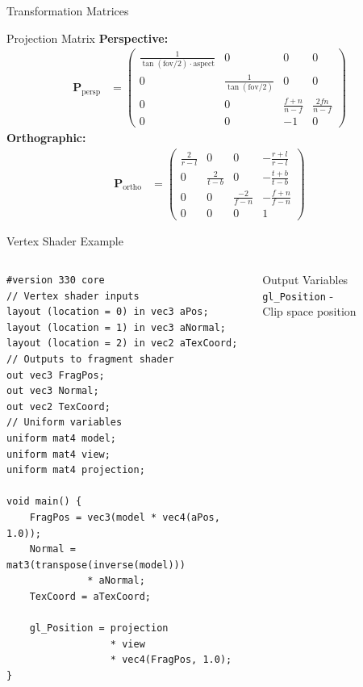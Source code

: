 \begin{frame}{Transformation Matrices}
{\begin{mathbox}{Projection Matrix}
      \textbf{Perspective:}
      \begin{align*}
        \mathbf{P}_{\text{persp}} &=
        \begin{pmatrix}
          \frac{1}{\tan(\text{fov}/2) \cdot \text{aspect}} & 0 & 0 & 0 \\
          0 & \frac{1}{\tan(\text{fov}/2)} & 0 & 0 \\
          0 & 0 & \frac{f+n}{n-f} & \frac{2fn}{n-f} \\
          0 & 0 & -1 & 0
        \end{pmatrix}
      \end{align*}
      \textbf{Orthographic:}
      \begin{align*}
        \mathbf{P}_{\text{ortho}} &=
        \begin{pmatrix}
          \frac{2}{r-l} & 0 & 0 & -\frac{r+l}{r-l} \\
          0 & \frac{2}{t-b} & 0 & -\frac{t+b}{t-b} \\
          0 & 0 & \frac{-2}{f-n} & -\frac{f+n}{f-n} \\
          0 & 0 & 0 & 1
        \end{pmatrix}
      \end{align*}
    \end{mathbox}
  }
\end{frame}

\begin{frame}[fragile]{Vertex Shader Example}
  \begin{columns}
    \begin{column}{0.6\textwidth}
      \begin{verbatim}
#version 330 core
// Vertex shader inputs
layout (location = 0) in vec3 aPos;
layout (location = 1) in vec3 aNormal;
layout (location = 2) in vec2 aTexCoord;
// Outputs to fragment shader
out vec3 FragPos;
out vec3 Normal;
out vec2 TexCoord;
// Uniform variables
uniform mat4 model;
uniform mat4 view;
uniform mat4 projection;

void main() {
    FragPos = vec3(model * vec4(aPos, 1.0));
    Normal = mat3(transpose(inverse(model)))
              * aNormal;
    TexCoord = aTexCoord;

    gl_Position = projection
                  * view
                  * vec4(FragPos, 1.0);
}
      \end{verbatim}
    \end{column}
    \begin{column}{0.4\textwidth}
      \begin{conceptbox}{Output Variables}
        \texttt{\textcolor{PrimaryColor}{gl\_Position}} - \\ Clip space position
      \end{conceptbox}
    \end{column}
  \end{columns}
\end{frame}

